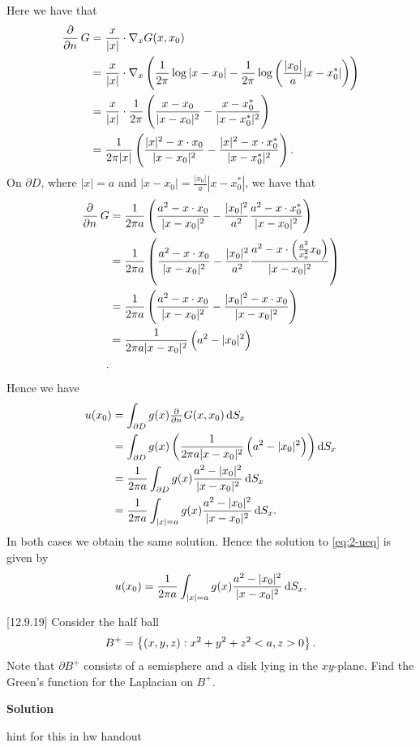 \documentclass{article}
\begin{document}
Here we have that
%
\begin{align*}
    \dpd{}{n} G
        &= \frac{x}{|x|} \cdot \nabla_x G(x, x_0) \\
        &= \frac{x}{|x|} \cdot \nabla_x \del{\frac{1}{2 \pi} \log |x - x_0| - \frac{1}{2 \pi} \log \del{\frac{|x_0|}{a} |x - x_0^*|}} \\
        &= \frac{x}{|x|} \cdot \frac{1}{2 \pi} \del{\frac{x - x_0}{|x - x_0|^2} - \frac{x - x_0^*}{|x - x_0^*|^2}} \\
        &= \frac{1}{2 \pi |x|} \del{\frac{|x|^2 - x \cdot x_0}{|x - x_0|^2} - \frac{|x|^2 - x \cdot x_0^*}{|x - x_0^*|^2}}
        .
\end{align*}
%
On $\partial D$, where $|x| = a$ and $|x - x_0| = \frac{|x_0|}{a} |x - x_0^*|$, we have that
%
\begin{align*}
    \dpd{}{n} G
        &= \frac{1}{2 \pi a} \del{\frac{a^2 - x \cdot x_0}{|x - x_0|^2} - \frac{|x_0|^2}{a^2} \frac{a^2 - x \cdot x_0^*}{|x - x_0|^2}} \\
        &= \frac{1}{2 \pi a} \del{\frac{a^2 - x \cdot x_0}{|x - x_0|^2} - \frac{|x_0|^2}{a^2} \frac{a^2 - x \cdot \del{\frac{a^2}{x_0^2} x_0}}{|x - x_0|^2}} \\
        &= \frac{1}{2 \pi a} \del{\frac{a^2 - x \cdot x_0}{|x - x_0|^2} - \frac{|x_0|^2 - x \cdot x_0}{|x - x_0|^2}} \\
        &= \frac{1}{2 \pi a |x - x_0|^2} \del{a^2 - |x_0|^2} \\
        .
\end{align*}
%
Hence we have
%
\begin{align*}
    u(x_0)
        &= \int_{\partial D} g(x) \pd{}{n} G(x, x_0) \dif S_x \\
        &= \int_{\partial D} g(x) \del{\frac{1}{2 \pi a |x - x_0|^2} \del{a^2 - |x_0|^2}} \dif S_x \\
        &= \frac{1}{2 \pi a} \int_{\partial D} g(x) \frac{a^2 - |x_0|^2}{|x - x_0|^2} \dif S_x \\
        &= \frac{1}{2 \pi a} \int_{|x| = a} g(x) \frac{a^2 - |x_0|^2}{|x - x_0|^2} \dif S_x
        .
\end{align*}
%
In both cases we obtain the same solution. Hence the solution to \eqref{eq:2-ueq} is given by
%
\begin{equation*}
    u(x_0) = \frac{1}{2 \pi a} \int_{|x| = a} g(x) \frac{a^2 - |x_0|^2}{|x - x_0|^2} \dif S_x
    .
\end{equation*}

\newpage

[12.9.19] Consider the half ball
%
\begin{equation*}
    B^+ = \cbr[1]{(x, y, z): x^2 + y^2 + z^2 < a, z > 0}
    .
\end{equation*}
%
Note that $\partial B^+$ consists of a semisphere and a disk lying in
the $x y$-plane. Find the Green's function for the Laplacian on $B^+$.

\textbf{Solution}

hint for this in hw handout
\end{document}
